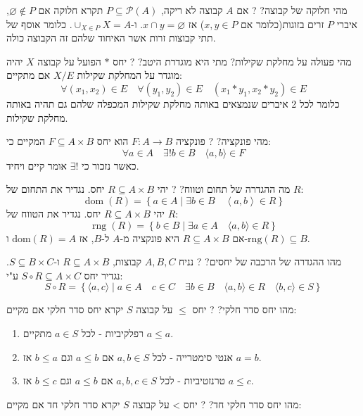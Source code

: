 \documentclass{tstextbook}
\begin{document}
מהי חלוקה של קבוצה?
?
אם \(A\) קבוצה לא ריקה, \(P\subseteq \mathcal{P}(A)\) תקרא חלוקה אם \(\varnothing \not\in P\), איברי \(P\) זרים בזוגות(כלומר אם \(x,y \in P\)) אז \(x \cap y = \varnothing\). ו-\(\cup_{X \in P} X=A\). כלומר אוסף של תתי קבוצות זרות אשר האיחוד שלהם זה הקבוצה כולה.

מהי פעולה על מחלקת שקילות? מתי היא מוגדרת היטב?
?
יחס \(*\) הפועל על קבוצה \(X\) יהיה מוגדר על המחלקת שקילות \(X / E\) אם מתקיים:
$$\forall (x_{1},x_{2})\in E\quad \forall(y_{1},y_{2})\in E\quad (x_{1}*y_{1},x_{2}*y_{2})\in E$$
כלומר לכל 2 איברים שנמצאים באותה מחלקת שקילות המכפלה שלהם גם תהיה באותה מחלקת שקילות.

מהי פונקציה?
?
פונקציה \(F:A\to B\) הוא יחס \(F\subseteq A\times B\) המקיים כי:
$$\forall a \in A\quad \exists! b\in B\quad \langle a, b \rangle \in F$$
כאשר נזכור כי \(\exists!\) אומר קיים ויחיד.

מה ההגדרה של תחום וטווח?
?
יהי \(R\subseteq A\times B\) יחס. נגדיר את התחום של \(R\):
$$\operatorname{dom}\left(R\right)=\left\{a\in A\mid\exists b\in B\quad\left\langle a,b\right\rangle\in R\right\}$$
יהי \(R\subseteq A\times B\) יחס. נגדיר את הטווח של \(R\):
$$\operatorname{rng}\left(R\right)=\left\{b\in B\mid\exists a\in A\quad\langle a,b\rangle\in R\right\}$$
אם \(R\subseteq A\times B\) היא פונקציה מ-\(A\) ל-\(B\), אז \(\mathrm{dom}(R)=A\) ו-\(\mathrm{rng}(R)\subseteq B\).

מהו ההגדרה של הרכבה של יחסים?
?
נניח \(A,B,C\) קבוצות, \(R\subseteq A\times B\) ו-\(S\subseteq B\times C\). נגדיר יחס \(S\circ R\subseteq A\times C\) ע"י:
$$S\circ R = \left\{  \langle a, c \rangle \mid a\in A\quad c\in C \quad \exists b \in B\quad \langle a, b \rangle \in R\quad \langle b, c \rangle \in S \right\}$$

מהו יחס סדר חלקי?
?
יחס \(\leq\) על קבוצה \(S\) יקרא יחס סדר חלקי אם מקיים:

\begin{enumerate}
  \item רפלקיביות - לכל \(a \in S\) מתקיים \(a \leq a\). 


  \item אנטי סימטרייה - לכל \(a,b \in S\) אם \(a\leq b\) וגם \(b\leq a\) אז \(a=b\). 


  \item טרנזטיביות - לכל \(a,b,c \in S\) אם \(a\leq b\) וגם \(b\leq c\) אז \(a\leq c\). 


\end{enumerate}
מהו יחס סדר חלקי חד?
?
יחס > על קבוצה \(S\) יקרא סדר חלקי חד אם מקיים:
\end{document}
